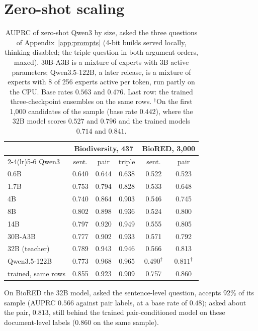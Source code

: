 \documentclass[11pt]{article}
\begin{document}
\section{Zero-shot scaling}
\label{app:scaling}

\begin{table}[t]\centering\footnotesize
\setlength{\tabcolsep}{3.2pt}
\begin{tabular}{lccccc}
\toprule
 & \multicolumn{3}{c}{Biodiversity, 437} & \multicolumn{2}{c}{BioRED, 3{,}000} \\
\cmidrule(lr){2-4}\cmidrule(lr){5-6}
Qwen3 & sent. & pair & triple & sent. & pair \\
\midrule
0.6B & 0.640 & 0.644 & 0.638 & 0.522 & 0.523 \\
1.7B & 0.753 & 0.794 & 0.828 & 0.533 & 0.648 \\
4B   & 0.740 & 0.864 & 0.903 & 0.546 & 0.745 \\
8B   & 0.802 & 0.898 & 0.936 & 0.524 & 0.800 \\
14B  & 0.797 & 0.920 & 0.949 & 0.555 & 0.805 \\
30B-A3B & 0.777 & 0.902 & 0.933 & 0.571 & 0.792 \\
32B (teacher) & 0.789 & 0.943 & 0.946 & 0.566 & 0.813 \\
\midrule
Qwen3.5-122B & 0.773 & 0.968 & 0.965 & $0.490^\dagger$ & $0.811^\dagger$ \\
\midrule
trained, same rows & 0.855 & 0.923 & 0.909 & 0.757 & 0.860 \\
\bottomrule
\end{tabular}
\caption{AUPRC of zero-shot Qwen3 \citep{qwen2025technical} by size, asked the three questions of
Appendix~\ref{app:prompts} (4-bit builds served locally, thinking disabled; the triple question in
both argument orders, maxed). 30B-A3B is a mixture of experts with 3B active parameters;
Qwen3.5-122B, a later release, is a mixture of experts with 8 of 256 experts active per token, run
partly on the CPU. Base rates $0.563$ and $0.476$. Last row: the trained three-checkpoint ensembles
on the same rows. $^\dagger$On the first 1{,}000 candidates of the sample (base rate $0.442$), where
the 32B model scores $0.527$ and $0.796$ and the trained models $0.714$ and $0.841$.}
\label{tab:scaling}
\end{table}

On BioRED the 32B model, asked the sentence-level question, accepts 92\% of its sample (AUPRC $0.566$
against pair labels, at a base rate of $0.48$); asked about the pair, $0.813$, still behind the
trained pair-conditioned model on these document-level labels ($0.860$ on the same sample).
\end{document}
